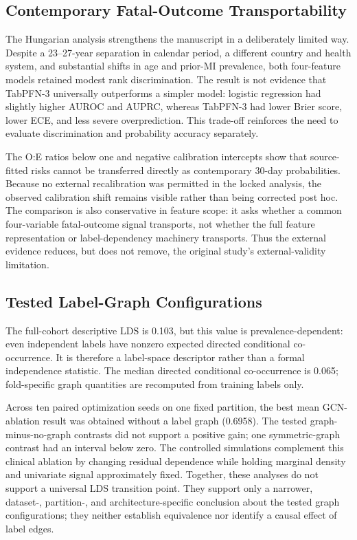 \documentclass{ieeeaccess}
\begin{document}
\subsection{Contemporary Fatal-Outcome Transportability}

The Hungarian analysis strengthens the manuscript in a deliberately limited way. Despite a 23--27-year separation in calendar period, a different country and health system, and substantial shifts in age and prior-MI prevalence, both four-feature models retained modest rank discrimination. The result is not evidence that TabPFN-3 universally outperforms a simpler model: logistic regression had slightly higher AUROC and AUPRC, whereas TabPFN-3 had lower Brier score, lower ECE, and less severe overprediction. This trade-off reinforces the need to evaluate discrimination and probability accuracy separately.

The O:E ratios below one and negative calibration intercepts show that source-fitted risks cannot be transferred directly as contemporary 30-day probabilities. Because no external recalibration was permitted in the locked analysis, the observed calibration shift remains visible rather than being corrected post hoc. The comparison is also conservative in feature scope: it asks whether a common four-variable fatal-outcome signal transports, not whether the full feature representation or label-dependency machinery transports. Thus the external evidence reduces, but does not remove, the original study's external-validity limitation.

\subsection{Tested Label-Graph Configurations}

The full-cohort descriptive $\mathrm{LDS}$ is 0.103, but this value is prevalence-dependent: even independent labels have nonzero expected directed conditional co-occurrence. It is therefore a label-space descriptor rather than a formal independence statistic. The median directed conditional co-occurrence is 0.065; fold-specific graph quantities are recomputed from training labels only.

Across ten paired optimization seeds on one fixed partition, the best mean GCN-ablation result was obtained without a label graph (0.6958). The tested graph-minus-no-graph contrasts did not support a positive gain; one symmetric-graph contrast had an interval below zero. The controlled simulations complement this clinical ablation by changing residual dependence while holding marginal density and univariate signal approximately fixed. Together, these analyses do not support a universal $\mathrm{LDS}$ transition point. They support only a narrower, dataset-, partition-, and architecture-specific conclusion about the tested graph configurations; they neither establish equivalence nor identify a causal effect of label edges.
\end{document}

